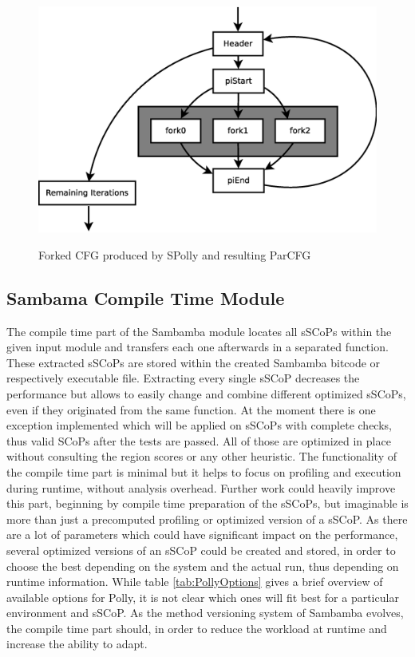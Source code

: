 \begin{figure}[htbp]
{\begin{minipage}[c][8cm]{0.50\textwidth}
    \includegraphics[width=\textwidth]{Figures/ForkJoinParCFG.eps}
    \label{fig:ForkJoinParCFG}
    \end{minipage}
  }
  \caption{Forked CFG produced by SPolly and resulting ParCFG}
  \label{fig:CreateParCFG}  
\end{figure}
\resetlst

\orange
\begin{shaded}
\section{Sambama Compile Time Module}
The compile time part of the Sambamba module locates all sSCoPs
within the given input module and transfers each one afterwards in a separated 
function. These extracted sSCoPs are stored within the created Sambamba 
bitcode or respectively executable file. Extracting every single sSCoP 
decreases the performance but allows to easily change and combine different 
optimized sSCoPs, even if they originated from the same function.   
At the moment there is one exception implemented which will be applied on sSCoPs
with complete checks, thus valid SCoPs after the tests are passed. All of those
are optimized in place without consulting the region scores or any other heuristic.
The functionality of the compile time part is minimal but it helps to focus 
on profiling and execution during runtime, without analysis overhead. 
Further work could heavily improve this part, beginning by compile time 
preparation of the sSCoPs, but imaginable is more than just a precomputed
profiling or optimized version of a sSCoP.
As there are a lot of parameters which could have significant impact 
on the performance, several optimized versions of an sSCoP could be created
and stored, in order to choose the best depending on the system and the actual
run, thus depending on runtime information.
While table \ref{tab:PollyOptions} gives a brief
overview of available options for Polly, it is not clear which ones will
fit best for a particular environment and sSCoP. 
As the method versioning system of Sambamba evolves, the compile time part 
should, in order to reduce the workload at runtime and increase the ability to
adapt. 

\end{shaded}

